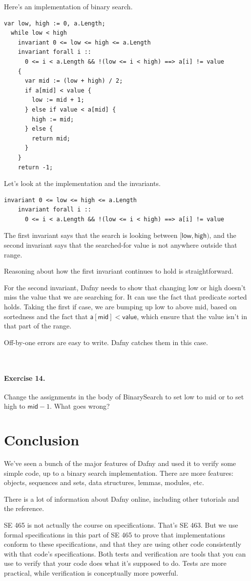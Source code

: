 \documentclass[11pt]{article}
\begin{document}
Here's an implementation of binary search.
\begin{lstlisting}[language=dafny]
  var low, high := 0, a.Length;
  while low < high
    invariant 0 <= low <= high <= a.Length
    invariant forall i ::
      0 <= i < a.Length && !(low <= i < high) ==> a[i] != value
    {   
      var mid := (low + high) / 2;
      if a[mid] < value {
        low := mid + 1;
      } else if value < a[mid] {
        high := mid;
      } else {
        return mid;
      }
    }
    return -1;
\end{lstlisting}
Let's look at the implementation and the invariants.
\begin{lstlisting}[language=dafny]
    invariant 0 <= low <= high <= a.Length
    invariant forall i ::
      0 <= i < a.Length && !(low <= i < high) ==> a[i] != value
\end{lstlisting}
The first invariant says that the search is looking between
$[\mathsf{low}, \mathsf{high})$, and the second invariant
says that the searched-for value is not anywhere outside
that range.

Reasoning about how the first invariant continues to hold is
straightforward.

For the second invariant, Dafny needs to show that changing
\textsf{low} or \textsf{high} doesn't miss the value that we are
searching for. It can use the fact that predicate \textsf{sorted}
holds. Taking the first \textsf{if} case, we are bumping up
\textsf{low} to above \textsf{mid}, based on sortedness and the fact
that $\mathsf{a}[\mathsf{mid}] < \mathsf{value}$, which ensure that
the value isn't in that part of the range.

Off-by-one errors are easy to write. Dafny catches them in this case.

~\\[-4em]
\paragraph{Exercise 14.} Change the assignments in the body of
\textsf{BinarySearch} to set \textsf{low} to \textsf{mid} or
to set \textsf{high} to $\mathsf{mid}-1$. What goes wrong?

\section*{Conclusion}
We've seen a bunch of the major features of Dafny and used it to verify
some simple code, up to a binary search implementation. There are more
features: objects, sequences and sets, data structures, lemmas, modules, etc.

There is a lot of information about Dafny online, including other
tutorials and the reference.

SE 465 is not actually the course on specifications. That's SE 463.
But we use formal specifications in this part of SE 465 to prove
that implementations conform to these specifications, and that
they are using other code consistently with that code's specifications.
Both tests and verification are tools that you can use to verify
that your code does what it's supposed to do. Tests are more
practical, while verification is conceptually more powerful.
\end{document}
